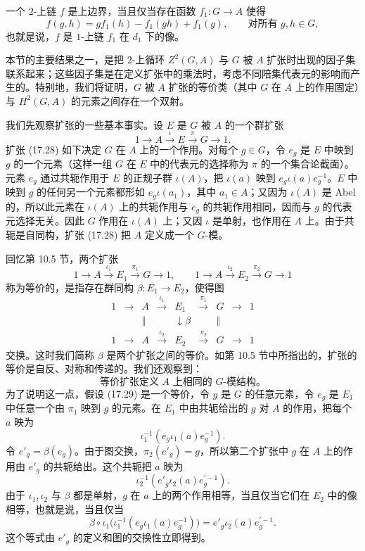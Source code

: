 一个 $2$-上链 $f$ 是上边界，当且仅当存在函数 $f_1:G\to A$ 使得
\[
  f(g,h)=g f_1(h)-f_1(gh)+f_1(g),
  \qquad\text{对所有 }g,h\in G,
  \tag{17.27}
\]
也就是说，$f$ 是 $1$-上链 $f_1$ 在 $d_1$ 下的像。

本节的主要结果之一，是把 $2$-上循环 $Z^2(G,A)$ 与 $G$ 被 $A$ 扩张时出现的因子集联系起来；这些因子集是在定义扩张中的乘法时，考虑不同陪集代表元的影响而产生的。特别地，我们将证明，$G$ 被 $A$ 扩张的等价类（其中 $G$ 在 $A$ 上的作用固定）与 $H^2(G,A)$ 的元素之间存在一个双射。

我们先观察扩张的一些基本事实。设 $E$ 是 $G$ 被 $A$ 的一个群扩张
\[
  1\to A\xrightarrow{\iota}E\xrightarrow{\pi}G\to 1.
  \tag{17.28}
\]
扩张 (17.28) 如下决定 $G$ 在 $A$ 上的一个作用。对每个 $g\in G$，令 $e_g$ 是 $E$ 中映到 $g$ 的一个元素（这样一组 $G$ 在 $E$ 中的代表元的选择称为 $\pi$ 的一个集合论截面）。元素 $e_g$ 通过共轭作用于 $E$ 的正规子群 $\iota(A)$，把 $\iota(a)$ 映到 $e_g\iota(a)e_g^{-1}$。$E$ 中映到 $g$ 的任何另一个元素都形如 $e_g\iota(a_1)$，其中 $a_1\in A$；又因为 $\iota(A)$ 是 Abel 的，所以此元素在 $\iota(A)$ 上的共轭作用与 $e_g$ 的共轭作用相同，因而与 $g$ 的代表元选择无关。因此 $G$ 作用在 $\iota(A)$ 上；又因 $\iota$ 是单射，也作用在 $A$ 上。由于共轭是自同构，扩张 (17.28) 把 $A$ 定义成一个 $G$-模。

回忆第 10.5 节，两个扩张
\[
  1\to A\xrightarrow{\iota_1}E_1\xrightarrow{\pi_1}G\to1,
  \qquad
  1\to A\xrightarrow{\iota_2}E_2\xrightarrow{\pi_2}G\to1
\]
称为等价的，是指存在群同构 $\beta:E_1\to E_2$，使得图
\[
\begin{array}{ccccccccc}
1&\longrightarrow&A&\xrightarrow{\iota_1}&E_1&\xrightarrow{\pi_1}&G&\longrightarrow&1\\
 &&\Vert&&\downarrow\beta&&\Vert&&\\
1&\longrightarrow&A&\xrightarrow{\iota_2}&E_2&\xrightarrow{\pi_2}&G&\longrightarrow&1
\end{array}
\tag{17.29}
\]
交换。这时我们简称 $\beta$ 是两个扩张之间的等价。如第 10.5 节中所指出的，扩张的等价是自反、对称和传递的。我们还观察到：
\[
  \text{等价扩张定义 $A$ 上相同的 $G$-模结构。}
\]
为了说明这一点，假设 (17.29) 是一个等价，令 $g$ 是 $G$ 的任意元素，令 $e_g$ 是 $E_1$ 中任意一个由 $\pi_1$ 映到 $g$ 的元素。在 $E_1$ 中由共轭给出的 $g$ 对 $A$ 的作用，把每个 $a$ 映为
\[
  \iota_1^{-1}(e_g\iota_1(a)e_g^{-1}).
\]
令 $e'_g=\beta(e_g)$。由于图交换，$\pi_2(e'_g)=g$，所以第二个扩张中 $g$ 在 $A$ 上的作用由 $e'_g$ 的共轭给出。这个共轭把 $a$ 映为
\[
  \iota_2^{-1}(e'_g\iota_2(a)e_g^{'-1}).
\]
由于 $\iota_1,\iota_2$ 与 $\beta$ 都是单射，$g$ 在 $a$ 上的两个作用相等，当且仅当它们在 $E_2$ 中的像相等，也就是说，当且仅当
\[
  \beta\circ\iota_1\bigl(\iota_1^{-1}(e_g\iota_1(a)e_g^{-1})\bigr)=e'_g\iota_2(a)e_g^{'-1}.
\]
这个等式由 $e'_g$ 的定义和图的交换性立即得到。

